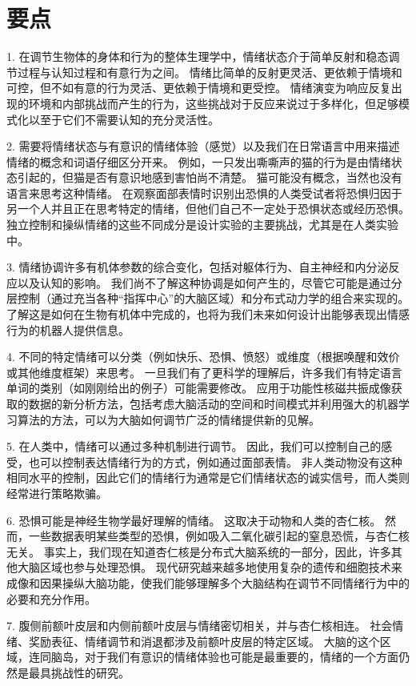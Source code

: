 \section{要点}

1. 在调节生物体的身体和行为的整体生理学中，情绪状态介于简单反射和稳态调节过程与认知过程和有意行为之间。
情绪比简单的反射更灵活、更依赖于情境和可控，但不如有意的行为灵活、更依赖于情境和更受控。
情绪演变为响应反复出现的环境和内部挑战而产生的行为，这些挑战对于反应来说过于多样化，但足够模式化以至于它们不需要认知的充分灵活性。


2. 需要将情绪状态与有意识的情绪体验（感觉）以及我们在日常语言中用来描述情绪的概念和词语仔细区分开来。
例如，一只发出嘶嘶声的猫的行为是由情绪状态引起的，但猫是否有意识地感到害怕尚不清楚。
猫可能没有概念，当然也没有语言来思考这种情绪。
在观察面部表情时识别出恐惧的人类受试者将恐惧归因于另一个人并且正在思考特定的情绪，但他们自己不一定处于恐惧状态或经历恐惧。
独立控制和操纵情绪的这些不同成分是设计实验的主要挑战，尤其是在人类实验中。


3. 情绪协调许多有机体参数的综合变化，包括对躯体行为、自主神经和内分泌反应以及认知的影响。
我们尚不了解这种协调是如何产生的，尽管它可能是通过分层控制（通过充当各种“指挥中心”的大脑区域）和分布式动力学的组合来实现的。
了解这是如何在生物有机体中完成的，也将为我们未来如何设计出能够表现出情感行为的机器人提供信息。


4. 不同的特定情绪可以分类（例如快乐、恐惧、愤怒）或维度（根据唤醒和效价或其他维度框架）来思考。
一旦我们有了更科学的理解后，许多我们有特定语言单词的类别（如刚刚给出的例子）可能需要修改。
应用于功能性核磁共振成像获取的数据的新分析方法，包括考虑大脑活动的空间和时间模式并利用强大的机器学习算法的方法，可以为大脑如何调节广泛的情绪提供新的见解。


5. 在人类中，情绪可以通过多种机制进行调节。
因此，我们可以控制自己的感受，也可以控制表达情绪行为的方式，例如通过面部表情。
非人类动物没有这种相同水平的控制，因此它们的情绪行为通常是它们情绪状态的诚实信号，而人类则经常进行策略欺骗。


6. 恐惧可能是神经生物学最好理解的情绪。
这取决于动物和人类的杏仁核。
然而，一些数据表明某些类型的恐惧，例如吸入二氧化碳引起的窒息恐慌，与杏仁核无关。
事实上，我们现在知道杏仁核是分布式大脑系统的一部分，因此，许多其他大脑区域也参与处理恐惧。
现代研究越来越多地使用复杂的遗传和细胞技术来成像和因果操纵大脑功能，使我们能够理解多个大脑结构在调节不同情绪行为中的必要和充分作用。


7. 腹侧前额叶皮层和内侧前额叶皮层与情绪密切相关，并与杏仁核相连。
社会情绪、奖励表征、情绪调节和消退都涉及前额叶皮层的特定区域。
大脑的这个区域，连同脑岛，对于我们有意识的情绪体验也可能是最重要的，情绪的一个方面仍然是最具挑战性的研究。

